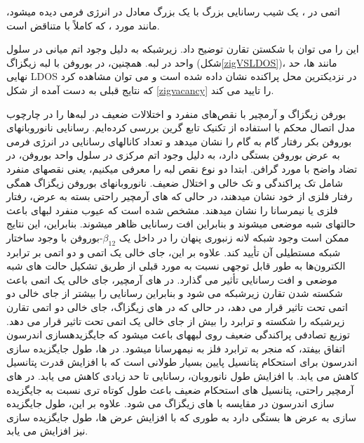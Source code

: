 اتمی در ، یک شیب رسانایی بزرگ با یک  بزرگ معادل در انرژی فرمی دیده میشود، مانند مورد ، که کاملاً با  متناقض است.

این را می توان با شکستن تقارن توضیح داد. زیرشبکه به دلیل وجود اتم میانی در سلول واحد در لبه. همچنین، در بوروفن با لبه زیگزاگ (شکل\ref{zigVSLDOS})، مانند ها، حد نهایی LDOS در نزدیکترین محل پراکنده نشان داده شده است و می توان مشاهده کرد که نتایج قبلی به دست آمده از شکل \ref{zigvacancy} را تایید می کند.

بورفن زیگزاگ و آرمچیر با نقص‌های منفرد و اختلالات ضعیف در لبه‌ها را در چارچوب مدل اتصال محکم با استفاده از تکنیک تابع گرین بررسی کرده‌ایم. رسانایی نانوروبانهای بوروفن بکر رفتار گام به گام را نشان میدهد و تعداد کانالهای رسانایی در انرژی فرمی به عرض بوروفن بستگی دارد، به دلیل وجود اتم مرکزی در سلول واحد بوروفن، در تضاد واضح با مورد گرافن. ابتدا دو نوع نقص لبه را معرفی میکنیم، یعنی نقصهای منفرد شامل تک پراکندگی و تک خالی و اختلال ضعیف. نانوروبانهای بوروفن زیگزاگ همگی رفتار فلزی از خود نشان میدهند، در حالی که های آرمچیر راحتی بسته به عرض، رفتار فلزی یا نیمرسانا را نشان میدهند. مشخص شده است که عیوب منفرد لبهای باعث حالتهای شبه موضعی میشوند و بنابراین افت رسانایی ظاهر میشوند. بنابراین، این نتایج ممکن است وجود شبکه لانه زنبوری پنهان را در داخل یک $\beta_{12}$-بوروفن با وجود ساختار شبکه مستطیلی آن تأیید کند. علاوه بر این، جای خالی یک اتمی و دو اتمی بر ترابرد الکترون‌ها به طور قابل توجهی نسبت به مورد قبلی از طریق تشکیل حالت های شبه موضعی و افت رسانایی تأثیر می گذارد. در  های آرمچیر، جای خالی یک اتمی باعث شکسته شدن تقارن زیرشبکه می شود و بنابراین رسانایی را بیشتر از جای خالی دو اتمی تحت تاثیر قرار می دهد، در حالی که در  های زیگزاگ، جای خالی دو اتمی تقارن زیرشبکه را شکسته و ترابرد را بیش از جای خالی یک اتمی تحت تاثیر قرار می دهد. توزیع تصادفی پراکندگی ضعیف روی لبههای  باعث میشود که جایگزیدهسازی اندرسون اتفاق بیفتد، که منجر به ترابرد فلز به نیمهرسانا میشود. در  ها، طول جایگزیده سازی اندرسون برای استحکام پتانسیل پایین بسیار طولانی است که با افزایش قدرت پتانسیل کاهش می یابد. با افزایش طول نانوروبان، رسانایی تا حد زیادی کاهش می یابد. در  های آرمچیر راحتی، پتانسیل های استحکام ضعیف باعث طول کوتاه تری نسبت به جایگزیده سازی اندرسون در مقایسه با  های زیگزاگ می شود. علاوه بر این، طول جایگزیده سازی به عرض  ها بستگی دارد به طوری که با افزایش عرض  ها، طول جایگزیده سازی نیز افزایش می یابد.

